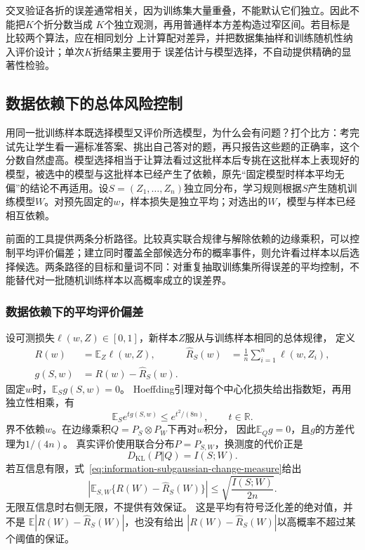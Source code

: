 交叉验证各折的误差通常相关，因为训练集大量重叠，不能默认它们独立。因此不能把\(K\)个折分数当成
\(K\)个独立观测，再用普通样本方差构造过窄区间。若目标是比较两个算法，应在相同划分
上计算配对差异，并把数据集抽样和训练随机性纳入评价设计；单次\(K\)折结果主要用于
误差估计与模型选择，不自动提供精确的显著性检验。

\subsection{数据依赖下的总体风险控制}
\label{sec:information-data-dependent-evaluation}

用同一批训练样本既选择模型又评价所选模型，为什么会有问题？打个比方：考完试先让学生看一遍标准答案、挑出自己答对的题，再只报告这些题的正确率，这个分数自然虚高。模型选择相当于让算法看过这批样本后专挑在这批样本上表现好的模型，被选中的模型与这批样本已经产生了依赖，原先“固定模型时样本平均无偏”的结论不再适用。设\(S=(Z_1,\ldots,Z_n)\)独立同分布，学习规则根据\(S\)产生随机训练模型\(W\)。对预先固定的\(w\)，样本损失是独立平均；对选出的\(W\)，模型与样本已经相互依赖。

前面的工具提供两条分析路径。比较真实联合规律与解除依赖的边缘乘积，可以控制平均评价偏差；建立同时覆盖全部候选分布的概率事件，则允许看过样本以后选择候选。两条路径的目标和量词不同：对重复抽取训练集所得误差的平均控制，不能替代对一批随机训练样本以高概率成立的误差界。

\subsubsection{数据依赖下的平均评价偏差}
\label{sec:information-mi-generalization}

设可测损失\(\ell(w,Z)\in[0,1]\)，新样本\(Z\)服从与训练样本相同的总体规律，
定义
\[
  \begin{aligned}
    R(w)&=\mathbb E_Z\ell(w,Z),&
    \widehat R_S(w)&=\frac1n\sum_{i=1}^n\ell(w,Z_i),\\
    g(S,w)&=R(w)-\widehat R_S(w).
  \end{aligned}
\]
固定\(w\)时，\(\mathbb E_Sg(S,w)=0\)。
Hoeffding引理对每个中心化损失给出指数矩，再用独立性相乘，有
\[
  \mathbb E_Se^{t g(S,w)}\leq e^{t^2/(8n)},\qquad t\in\mathbb R.
\]
界不依赖\(w\)。在边缘乘积\(Q=P_S\otimes P_W\)下再对\(w\)积分，
因此\(\mathbb E_Qg=0\)，且\(g\)的方差代理为\(1/(4n)\)。
真实评价使用联合分布\(P=P_{S,W}\)，换测度的代价正是
\[
  D_{\mathrm{KL}}(P\Vert Q)=I(S;W).
\]
若互信息有限，式~\eqref{eq:information-subgaussian-change-measure}给出
\begin{equation}
  \left|\mathbb E_{S,W}\{R(W)-\widehat R_S(W)\}\right|
  \leq\sqrt{\frac{I(S;W)}{2n}}.
  \label{eq:information-mi-generalization}
\end{equation}
无限互信息时右侧无限，不提供有效保证。
这是平均有符号泛化差的绝对值，并不是
\(\mathbb E|R(W)-\widehat R_S(W)|\)，也没有给出
\(|R(W)-\widehat R_S(W)|\)以高概率不超过某个阈值的保证。

